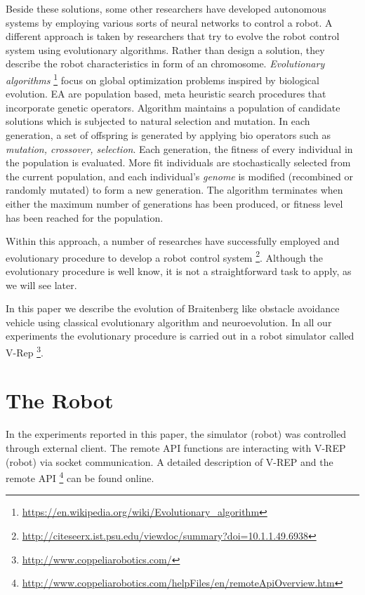 \documentclass[format=acmsmall, review=false, screen=true]{acmart}
\begin{document}
Beside these solutions, some other researchers have developed autonomous systems by employing various sorts of neural networks to control a robot. A  different approach is taken by researchers that try to evolve the robot control system using evolutionary algorithms. Rather than design a solution, they describe the robot characteristics in form of an chromosome. \emph{Evolutionary algorithms} \footnote{\url{https://en.wikipedia.org/wiki/Evolutionary_algorithm}} focus on global optimization problems inspired by biological evolution. EA are population based, meta heuristic search procedures that incorporate genetic operators. Algorithm maintains a population of candidate solutions which is subjected to natural selection and mutation. In each generation, a set of offspring is generated by applying bio operators such as \emph{mutation, crossover, selection}. Each generation, the fitness of every individual in the population is evaluated. More fit individuals are stochastically selected from the current population, and each individual's \emph{genome} is modified (recombined or randomly mutated) to form a new generation. The algorithm terminates when either the maximum number of generations has been produced, or fitness level has been reached for the population.

Within this approach, a number of researches have successfully employed and evolutionary procedure to develop a robot control system \footnote{\url{http://citeseerx.ist.psu.edu/viewdoc/summary?doi=10.1.1.49.6938}}. Although the evolutionary procedure is well know, it is not a straightforward task to apply, as we will see later.

In this paper we describe the evolution of Braitenberg like obstacle avoidance vehicle using classical evolutionary algorithm and neuroevolution. In all our experiments the evolutionary procedure is carried out in a robot simulator called V-Rep \footnote{\url{http://www.coppeliarobotics.com/}}.

\section{The Robot}

In the experiments reported in this paper, the simulator (robot) was controlled through external client. The remote API functions are interacting with V-REP (robot) via socket communication. A detailed description of V-REP and the remote API \footnote{\url{http://www.coppeliarobotics.com/helpFiles/en/remoteApiOverview.htm}} can be found online.
\end{document}

